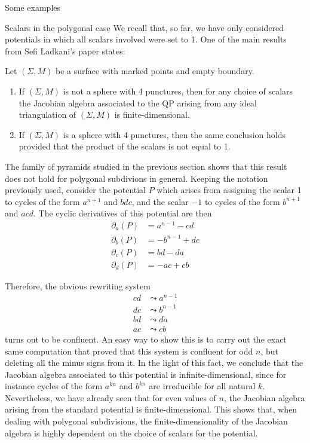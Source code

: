\begin{chapter}{Some examples}
\begin{section}{Scalars in the polygonal case}
We recall that, so far, we have only considered potentials in which all scalars involved were set to 1. One of the main results from Sefi Ladkani's paper \cite{Lad12} states:
\begin{thm} Let $(\Sigma, M)$ be a surface with marked points and empty boundary.
\begin{enumerate}
\item If $(\Sigma, M)$ is not a sphere with 4 punctures, then for any choice of scalars the Jacobian algebra associated to the QP arising from any ideal triangulation of $(\Sigma, M)$ is finite-dimensional.
\item If $(\Sigma, M)$ is a sphere with 4 punctures, then the same conclusion holds provided that the product of the scalars is not equal to 1.
\end{enumerate}
\end{thm}

The family of pyramids studied in the previous section shows that this result does not hold for polygonal subdivions in general. Keeping the notation previously used, consider the potential $P$ which arises from assigning the scalar 1 to cycles of the form $a^{n+1}$ and $bdc$, and the scalar $-1$ to cycles of the form $b^{n+1}$ and $acd$. The cyclic derivatives of this potential are then
\begin{align*}
\partial_a(P) &= a^{n-1} - cd\\
\partial_b(P) &= -b^{n-1} + dc\\
\partial_c(P) &= bd - da\\
\partial_d(P) &= -ac + cb
\end{align*}

Therefore, the obvious rewriting system
\begin{align*}
cd &\leadsto a^{n-1}\tag{$\partial_a$}\\
dc &\leadsto b^{n-1}\tag{$\partial_b$}\\
bd &\leadsto da\tag{$\partial_c$}\\
ac &\leadsto cb\tag{$\partial_d$}
\end{align*}
turns out to be confluent. An easy way to show this is to carry out the exact same computation that proved that this system is confluent for odd $n$, but deleting all the minus signs from it. In the light of this fact, we conclude that the Jacobian algebra associated to this potential is infinite-dimensional, since for instance cycles of the form $a^{kn}$ and $b^{kn}$ are irreducible for all natural $k$. Nevertheless, we have already seen that for even values of $n$, the Jacobian algebra arising from the standard potential is finite-dimensional. This shows that, when dealing with polygonal subdivisions, the finite-dimensionality of the Jacobian algebra is highly dependent on the choice of scalars for the potential.
\end{section}


\end{chapter}
